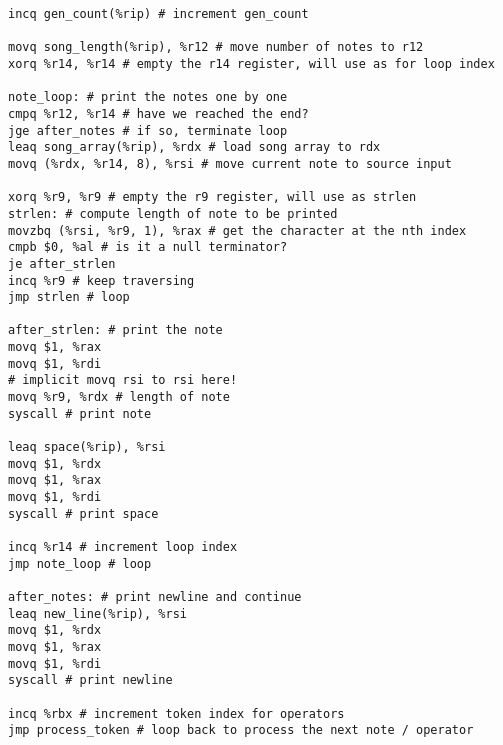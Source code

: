 \documentclass[a4paper,12pt]{article}
\begin{document}
\begin{lstlisting}[style=ATnTStyle]
incq gen_count(%rip) # increment gen_count

movq song_length(%rip), %r12 # move number of notes to r12
xorq %r14, %r14 # empty the r14 register, will use as for loop index

note_loop: # print the notes one by one
cmpq %r12, %r14 # have we reached the end?
jge after_notes # if so, terminate loop
leaq song_array(%rip), %rdx # load song array to rdx
movq (%rdx, %r14, 8), %rsi # move current note to source input

xorq %r9, %r9 # empty the r9 register, will use as strlen
strlen: # compute length of note to be printed
movzbq (%rsi, %r9, 1), %rax # get the character at the nth index
cmpb $0, %al # is it a null terminator?
je after_strlen
incq %r9 # keep traversing
jmp strlen # loop

after_strlen: # print the note
movq $1, %rax
movq $1, %rdi
# implicit movq rsi to rsi here!
movq %r9, %rdx # length of note
syscall # print note

leaq space(%rip), %rsi
movq $1, %rdx
movq $1, %rax
movq $1, %rdi
syscall # print space

incq %r14 # increment loop index
jmp note_loop # loop

after_notes: # print newline and continue
leaq new_line(%rip), %rsi
movq $1, %rdx
movq $1, %rax
movq $1, %rdi
syscall # print newline

incq %rbx # increment token index for operators
jmp process_token # loop back to process the next note / operator
\end{lstlisting}
\end{document}

